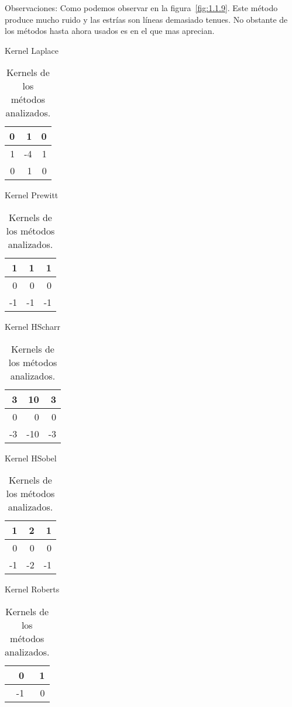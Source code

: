 Observaciones:
Como podemos observar en la figura~\ref{fig:1.1.9}.
Este método produce mucho ruido y las estrías son líneas demasiado tenues.
No obstante de los métodos hasta ahora usados es en el que mas aprecian.


\begin{table}[]

	\begin{minipage}{.5\linewidth}
		\centering
		\caption{Kernel Laplace}
		\label{F_k1}
		\begin{tabular}{|r|r|r|}
			\hline
			0 & 1  & 0 \\ \hline
			1 & -4 & 1 \\ \hline
			0 & 1  & 0 \\ \hline
		\end{tabular}
    \end{minipage}%
	\begin{minipage}{.5\linewidth}
		\centering
		\caption{Kernel Prewitt}
		\label{F_k2}
		\begin{tabular}{|r|r|r|}
			\hline
			1  & 1   & 1 \\ \hline
			0  & 0   & 0 \\ \hline
			-1 & -1  & -1 \\ \hline
		\end{tabular}
    \end{minipage}%

	\begin{minipage}{.5\linewidth}
		\centering
		\caption{Kernel HScharr}
		\label{F_k3}
		\begin{tabular}{|r|r|r|}
			\hline
			3  & 10  & 3 \\ \hline
			0  & 0   & 0 \\ \hline
			-3 & -10 & -3 \\ \hline
		\end{tabular}
    \end{minipage}%
	\begin{minipage}{.5\linewidth}
		\centering
		\caption{Kernel HSobel}
		\label{F_k4}
		\begin{tabular}{|r|r|r|}
			\hline
			1  & 2  & 1 \\ \hline
			0  & 0  & 0 \\ \hline
			-1 & -2 & -1 \\ \hline
		\end{tabular}
    \end{minipage}%
    
	\begin{minipage}{.5\linewidth}
		\centering
		\caption{Kernel Roberts}
		\label{F_k5}
		\begin{tabular}{|r|r|}
			\hline
			0  & 1 \\ \hline
			-1 & 0 \\ \hline
		\end{tabular}
    \end{minipage}%
	\caption{Kernels de los métodos analizados.}
\end{table}


